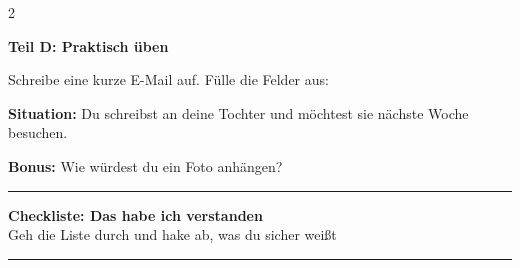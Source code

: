 \documentclass[a4paper,landscape,8pt]{extarticle}
\begin{document}
\begin{multicols}{2}
\columnbreak

\textbf{\large Teil D: Praktisch üben}

Schreibe eine kurze E-Mail auf. Fülle die Felder aus:

\vspace{3mm}

\textbf{Situation:} Du schreibst an deine Tochter und möchtest sie nächste Woche besuchen.

\vspace{3mm}


\vspace{5mm}

\textbf{Bonus:} Wie würdest du ein Foto anhängen?

\vspace{4mm}
\rule{\linewidth}{0.4pt}

\end{multicols}

\newpage


\begin{center}
{\LARGE\bfseries Checkliste: Das habe ich verstanden}\\[3pt]
{\normalsize Geh die Liste durch und hake ab, was du sicher weißt}
\end{center}

\vspace{3mm}
\hrule
\vspace{6mm}
\end{document}
